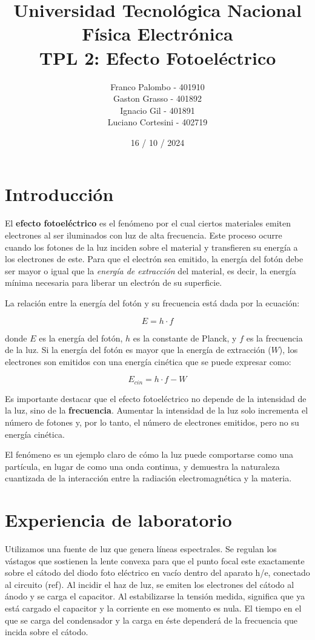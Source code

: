 \documentclass[a4paper,12pt]{report}
\title{%
  \fontsize{25}{0}\selectfont Universidad Tecnológica Nacional \\
  \fontsize{22}{30}\selectfont Física Electrónica \\
  \fontsize{18}{25}\selectfont TPL 2: Efecto Fotoeléctrico
}
\author{
Franco Palombo - 401910\\
Gaston Grasso - 401892\\
Ignacio Gil - 401891\\
Luciano Cortesini - 402719\\
}
\date{16 / 10 / 2024}
\begin{document}
\maketitle

\chapter{Introducción}
  El \textbf{efecto fotoeléctrico} es el fenómeno por el cual ciertos materiales emiten electrones al ser iluminados
  con luz de alta frecuencia. Este proceso ocurre cuando los fotones de la luz inciden sobre el material y transfieren
  su energía a los electrones de este. Para que el electrón sea emitido, la energía del fotón debe ser mayor o igual
  que la \textit{energía de extracción} del material, es decir, la energía mínima necesaria para liberar un electrón de
  su superficie.


  La relación entre la energía del fotón y su frecuencia está dada por la ecuación:

  \[
    E = h \cdot f
  \]

  donde \(E\) es la energía del fotón, \(h\) es la constante de Planck, y \(f\) es la frecuencia de la luz. Si la
  energía del fotón es mayor que la energía de extracción (\(W\)), los electrones son emitidos con una energía cinética
  que se puede expresar como:


  \[
    E_{cin} = h \cdot f - W
  \]

  Es importante destacar que el efecto fotoeléctrico no depende de la intensidad de la luz, sino de la
  \textbf{frecuencia}. Aumentar la intensidad de la luz solo incrementa el número de fotones y, por lo tanto, el número
  de electrones emitidos, pero no su energía cinética.

  El fenómeno es un ejemplo claro de cómo la luz puede comportarse como una partícula, en lugar de como una onda
  continua, y demuestra la naturaleza cuantizada de la interacción entre la radiación electromagnética y la materia.

\chapter{Experiencia de laboratorio}
  Utilizamos una fuente de luz que genera líneas espectrales. Se regulan los vástagos que sostienen la lente convexa
  para que el punto focal este exactamente sobre el cátodo del diodo foto eléctrico en vacío dentro del aparato h/e,
  conectado al circuito (ref). Al incidir el haz de luz, se emiten los electrones del cátodo al ánodo y se carga el
  capacitor. Al estabilizarse la tensión medida, significa que ya está cargado el capacitor y la corriente en ese
  momento es nula. El tiempo en el que se carga del condensador y la carga en éste dependerá de la frecuencia que
  incida sobre el cátodo.
\end{document}
